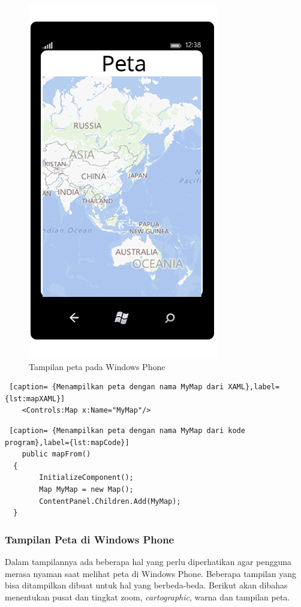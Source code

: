 \begin{figure}[h]
	\centering
		\includegraphics[scale=0.1]{Gambar/map}
	\caption{Tampilan peta pada Windows Phone}
	\label{fig:peta}
\end{figure}

\begin{lstlisting} [caption= {Menampilkan peta dengan nama MyMap dari XAML},label={lst:mapXAML}]
	<Controls:Map x:Name="MyMap"/>
\end{lstlisting}

\begin{lstlisting} [caption= {Menampilkan peta dengan nama MyMap dari kode program},label={lst:mapCode}]
	public mapFrom()
  {
		InitializeComponent();
		Map MyMap = new Map();
		ContentPanel.Children.Add(MyMap);
  }
\end{lstlisting}

\subsubsection{Tampilan Peta di Windows Phone}
\label{subsubsec:Tampilan Peta di Windows Phone}
\hspace{0.5cm} Dalam tampilannya ada beberapa hal yang perlu diperhatikan agar pengguna merasa nyaman saat melihat peta di Windows Phone. Beberapa tampilan yang bisa ditampilkan dibuat untuk hal yang berbeda-beda. Berikut akan dibahas menentukan pusat dan tingkat zoom, \textit{cartographic}, warna dan tampilan peta.

